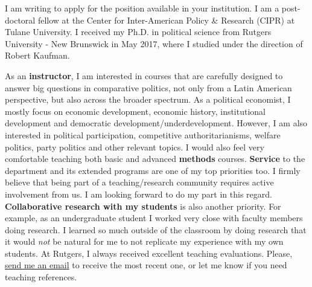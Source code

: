 \documentclass[10pt,stdletter,dateno,sigleft]{newlfm} %
\begin{document}
\begin{newlfm}


\vspace{-0.3cm}I am writing to apply for the position available in your institution. I am a post-doctoral fellow at the Center for Inter-American Policy \& Research (CIPR) at Tulane University. I received my Ph.D. in political science from Rutgers University - New Brunswick in May 2017, where I studied under the direction of Robert Kaufman.


As an {\bf instructor}, I am interested in courses that are carefully designed to answer big questions in comparative politics, not only from a Latin American perspective, but also across the broader spectrum. As a political economist, I mostly focus on economic development, economic history, institutional development and democratic development/underdevelopment. However, I am also interested in political participation, competitive authoritarianisms, welfare politics, party politics and other relevant topics. I would also feel very comfortable teaching both basic and advanced {\bf methods} courses. {\bf Service} to the department and its extended programs are one of my top priorities too. I firmly believe that being part of a teaching/research community requires active involvement from us. I am looking forward to do my part in this regard. {\bf Collaborative research with my students} is also another priority. For example, as an undergraduate student I worked very close with faculty members doing research. I learned so much outside of the classroom by doing research that it would \emph{not} be natural for me to not replicate my experience with my own students. At Rutgers, I always received excellent teaching evaluations. Please, \href{mailto:\filetext}{send me an email} to receive the most recent one, or let me know if you need teaching references.



\end{newlfm}
\end{document}
